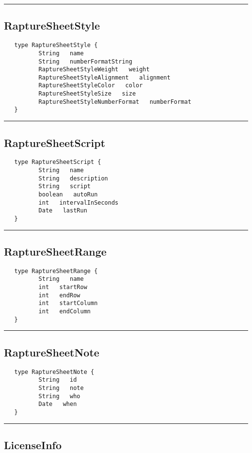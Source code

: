 \rule{15cm}{2pt}
\subsection{RaptureSheetStyle}
\label{type:RaptureSheetStyle}

\begin{verbatim}
   type RaptureSheetStyle {
          String   name
          String   numberFormatString
          RaptureSheetStyleWeight   weight
          RaptureSheetStyleAlignment   alignment
          RaptureSheetStyleColor   color
          RaptureSheetStyleSize   size
          RaptureSheetStyleNumberFormat   numberFormat
   }
\end{verbatim}

\rule{15cm}{2pt}
\subsection{RaptureSheetScript}
\label{type:RaptureSheetScript}

\begin{verbatim}
   type RaptureSheetScript {
          String   name
          String   description
          String   script
          boolean   autoRun
          int   intervalInSeconds
          Date   lastRun
   }
\end{verbatim}

\rule{15cm}{2pt}
\subsection{RaptureSheetRange}
\label{type:RaptureSheetRange}

\begin{verbatim}
   type RaptureSheetRange {
          String   name
          int   startRow
          int   endRow
          int   startColumn
          int   endColumn
   }
\end{verbatim}

\rule{15cm}{2pt}
\subsection{RaptureSheetNote}
\label{type:RaptureSheetNote}

\begin{verbatim}
   type RaptureSheetNote {
          String   id
          String   note
          String   who
          Date   when
   }
\end{verbatim}

\rule{15cm}{2pt}
\subsection{LicenseInfo}
\label{type:LicenseInfo}

